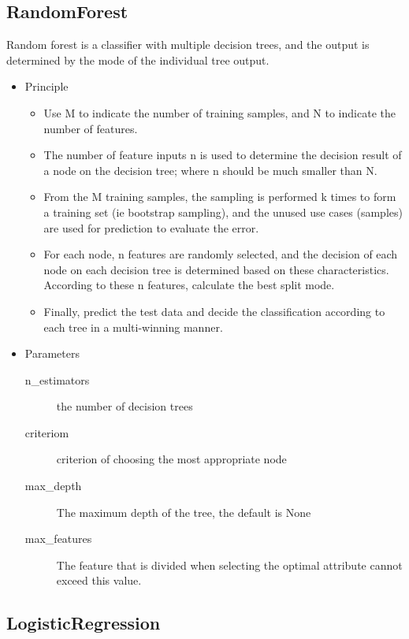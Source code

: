 \subsection{RandomForest}


Random forest is a classifier with 
multiple decision trees, and
the output is determined by 
the mode of the individual tree output.

\begin{itemize}
	\item Principle
	
	\begin{itemize}
		\item Use M to indicate the number of training samples, 
		and N to indicate the number of features.
		\item The number of feature inputs n is 
		used to determine the decision result 
		of a node on the decision tree; 
		where n should be much smaller than N.
		\item From the M training samples, 
		the sampling is performed k times to 
		form a training set (ie bootstrap sampling), 
		and the unused use cases (samples) are 
		used for prediction to evaluate the error.
		\item For each node, 
		n features are randomly selected, 
		and the decision of each node on each decision tree is 
		determined based on these characteristics. 
		According to these n features, 
		calculate the best split mode.
		\item Finally, predict the test data and 
		decide the classification 
		according to each tree in a multi-winning manner.
	\end{itemize}
	
	\item Parameters
	
	\begin{description}
		\item[n_estimators] the number of decision trees
		\item[criteriom] criterion of choosing 
		the most appropriate node
		\item[max_depth] The maximum depth of the tree, 
		the default is None 
		\item[max_features] The feature that is divided 
		when selecting the optimal attribute 
		cannot exceed this value.
	\end{description}

\end{itemize}


\subsection{LogisticRegression}


